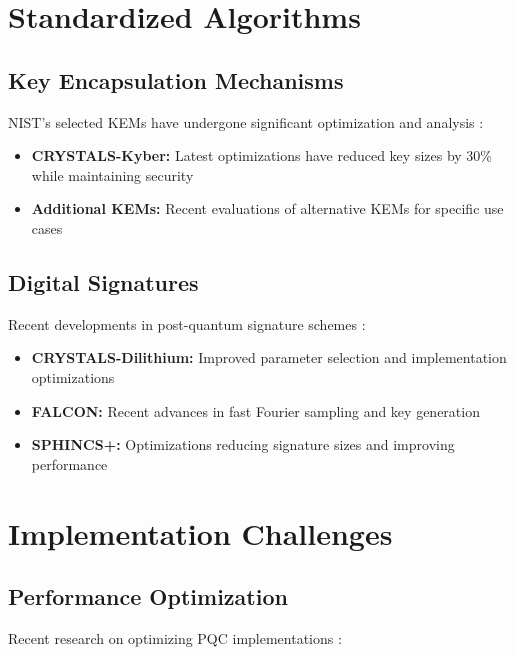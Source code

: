 \section{Standardized Algorithms}

\subsection{Key Encapsulation Mechanisms}
NIST's selected KEMs have undergone significant optimization and analysis \parencite{nist_kems_2024}:

\begin{itemize}
    \item \textbf{CRYSTALS-Kyber:} Latest optimizations have reduced key sizes by 30\% while maintaining security \parencite{kyber_optimizations_2024}
    \item \textbf{Additional KEMs:} Recent evaluations of alternative KEMs for specific use cases \parencite{alternative_kems_2024}
\end{itemize}

\subsection{Digital Signatures}
Recent developments in post-quantum signature schemes \parencite{pqc_signatures_2024}:

\begin{itemize}
    \item \textbf{CRYSTALS-Dilithium:} Improved parameter selection and implementation optimizations \parencite{dilithium_improvements_2024}
    \item \textbf{FALCON:} Recent advances in fast Fourier sampling and key generation \parencite{falcon_advances_2024}
    \item \textbf{SPHINCS+:} Optimizations reducing signature sizes and improving performance \parencite{sphincs_optimizations_2024}
\end{itemize}

\section{Implementation Challenges}

\subsection{Performance Optimization}
Recent research on optimizing PQC implementations \parencite{pqc_optimization_2024}:

